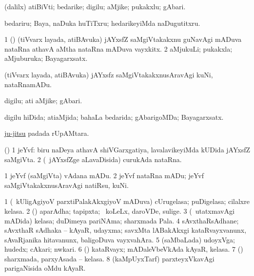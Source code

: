 \bentry
{}
\gl{\nA}
\bmng
(\bava dalilx) atiBiVti; bedarike; digilu; aMjike; pukakxlu; gAbari. 
\emng

\noindent
\gl{\nuga}
\bmng
{} bedariru; Baya, naDuka huTiTxru; hedarikeyiMda naDugutitxru. 
\emng
\eentry

\bentry
{}
\gl{\nA}
\bmng
\bnum
\num{1} (\ca) (tiVvarx layada, atiBAvuka) jAYxsfZ saMgiVtakakxnu guNavAgi mADuva nataRna athavA aMtha nataRna mADuva vayxkitx. 
\num{2} aMjukuLi; pukakxla; aMjuburuka; Bayagarxsatx. 
\enum
\emng
\eentry

\bentry
{}
\gl{\akirx}
\bmng
(tiVvarx layada, atiBAvuka) jAYxsfz saMgiVtakakxnusAravAgi kuNi, nataRnamADu. 
\emng
\eentry

\bentry
{}
\gl{\nA}
\bmng
digilu; ati aMjike; gAbari. 
\emng
\eentry

\bentry
{}
\gl{\gu}
\bmng
digilu hiDida; atiaMjida; bahaLa bedarida; gAbarigoMDa; Bayagarxsatx. 
\emng
\eentry

\bentry
{}
\gl{\nA}
\bmng
\hyperlink{ju-jitsu}{ju-jitsu} padada rUpAMtara. 
\emng
\eentry

\bentry
{}
\gl{\nA}
\bmng
(\ashi) 
\bnum
\num{1} jeYvf: biru naDeya athavA shiVGarxgatiya, lavalavikeyiMda kUDida jAYxsfZ saMgiVta. 
\num{2} (\kanmu\ jAYxsfZge aLavaDisida) curukAda nataRna. 
\enum
\emng
\eentry

\bentry
{}
\gl{\akirx}
\bmng
\bnum
\num{1} jeYvf (saMgiVta) vAdana mADu. 
\num{2} jeYvf nataRna mADu; jeYvf saMgiVtakakxnusAravAgi natiRsu, kuNi. 
\enum
\emng
\eentry

\bentry
{}
\gl{\nA}
\bmng
\bnum
\num{1} (\kanmu\ kUligAgiyoV parxtiPalakAkxgiyoV mADuva) cUrugelasa; puDigelasa; cilalxre kelasa. 
\num{2} (\ashi) aparAdha; tapipxta; \kanmu\ koLeLx, daroVDe, sulige. 
\num{3} (\kanmu\ utatxmavAgi mADida) kelasa; duDimeya pariNAma; sharxmada Pala. 
\num{4} sAvxthaRsAdhane; sAvxthaR sAdhaka -- kAyaR, udayxma; savxMta lABakAkxgi kataRvayxvanunx, sAvaRjanika hitavanunx, baligoDuva vayxvahAra. 
\num{5} (saMbaLada) udoyxVga; hudedx; cAkari; nwkari. 
\num{6} (\AmA) kataRvayx; mADaleVbeVkAda kAyaR, kelasa. 
\num{7} (\AmA) sharxmada, parxyAsada -- kelasa. 
\num{8} (kaMpUyxTarf) parxteyxVkavAgi parigaNisida oMdu kAyaR. 
\enum
\emng

